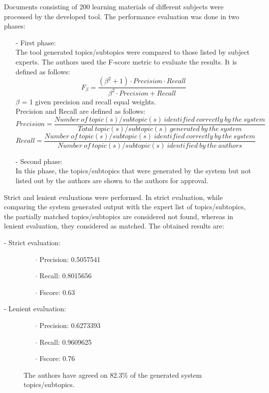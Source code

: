 \begin{description}
		Documents consisting of 200 learning materials of different subjects were processed by the developed tool. The performance evaluation was done in two phases:
\begin{itemize}
\item [-] First phase: \\
The tool generated topics/subtopics were compared to those listed by subject experts. The authors used the F-score metric to evaluate the results. It is defined as follows:
\[F_{\beta} = \frac{(\beta^{2}+1) \cdot Precision \cdot Recall}{\beta^{2} \cdot Precision + Recall}\]
$\beta$ = 1 given precision and recall equal weights. \\
Precision and Recall are defined as follows:
\[Precision = \frac{Number\ of\ topic(s)/subtopic(s)\ identified\ correctly\ by\ the\ system } { Total\ topic(s)/subtopic(s)\ generated\ by\ the\ system}\] 
\[Recall = \frac{Number\ of\ topic(s)/subtopic(s)\ identified\ correctly\ by\ the\ system} {Number\ of\ topic(s)/subtopic(s)\ identified\ by\ the\ authors}\]
\item [-] Second phase: \\
In this phase, the topics/subtopics that were generated by the system but not listed out by the authors are shown to the authors for approval.
\end{itemize}
\end{description} 
Strict and lenient evaluations were performed. In strict evaluation, while comparing the system generated output with the expert list of topics/subtopics, the partially matched topics/subtopics are considered not found, whereas in lenient evaluation, they considered as matched. The obtained results are:
\begin{description}
\item[- Strict evaluation:]  

\begin{itemize}
\item [{\large $\cdot$}] Precision: 0.5057541
\item [{\large $\cdot$}] Recall: 0.8015656
\item [{\large $\cdot$}] Fscore: 0.63
\end{itemize}
\item[- Lenient evaluation:] 

\begin{itemize}
\item [{\large $\cdot$}] Precision: 0.6273393
\item [{\large $\cdot$}] Recall: 0.9609625
\item [{\large $\cdot$}] Fscore: 0.76
\end{itemize}
The authors have agreed on 82.3\% of the generated system topics/subtopics.
\end{description}

